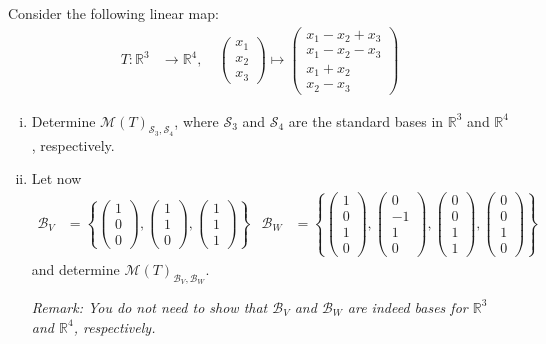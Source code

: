 \documentclass[11pt,letterpaper]{article}
\newcommand{\cB}{\mathcal{B}}
\newcommand{\cM}{\mathcal{M}}
\newcommand{\bR}{\mathbb{R}}
\newcommand{\cS}{\mathcal{S}}
\begin{document}
Consider the following linear map:
\begin{align*}
T\colon \bR^3 &\to \bR^4,\quad 
\begin{pmatrix}
x_1\\x_2\\x_3
\end{pmatrix}
\mapsto
\begin{pmatrix}
x_1 - x_2 + x_3\\
x_1 - x_2 - x_3\\
x_1 + x_2\\
x_2 - x_3
\end{pmatrix}
\end{align*}
\begin{enumerate}[(i)]
	\item Determine $\cM(T)_{\cS_3,\cS_4}$, where $\cS_3$ and $\cS_4$ are the standard bases in $\bR^3$ and $\bR^4$, respectively.
	\item Let now 
	\begin{align*}
	\cB_V &= \left\lbrace \left(\begin{smallmatrix}
	1\\0\\0
	\end{smallmatrix}\right),
	\left(\begin{smallmatrix}
	1\\1\\0
	\end{smallmatrix}\right)
	,
	\left(\begin{smallmatrix}
	1\\1\\1
	\end{smallmatrix}\right)\right\rbrace & 
	\cB_W &= \left\lbrace \left(\begin{smallmatrix}
	1\\0\\1\\0
	\end{smallmatrix}\right)
	,
	\left(\begin{smallmatrix}
	0\\-1\\1\\0
	\end{smallmatrix}\right)
	,
	\left(\begin{smallmatrix}
	0\\0\\1\\1
	\end{smallmatrix}\right)
	,
	\left(\begin{smallmatrix}
	0\\0\\1\\0
	\end{smallmatrix}\right)\right\rbrace
	\end{align*}
	and determine $\cM(T)_{\cB_V,\cB_W}$.
	
	{\itshape Remark: You do not need to show that $\cB_V$ and $\cB_W$ are indeed bases for $\bR^3$ and $\bR^4$, respectively.}
\end{enumerate}
\end{document}
